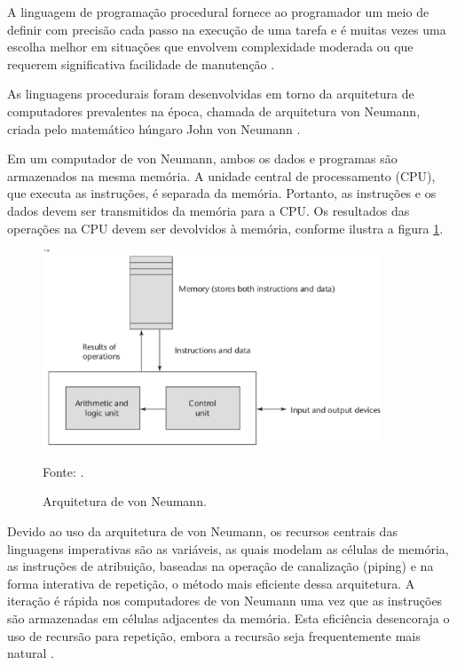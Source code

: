 A linguagem de programação procedural fornece ao programador  um meio de definir com precisão cada passo na execução de uma tarefa e é muitas vezes uma escolha melhor em situações que envolvem complexidade moderada ou que requerem significativa facilidade de manutenção \cite[pág.~22]{paquet2010}.

As linguagens procedurais foram desenvolvidas em torno da arquitetura de computadores prevalentes na época, chamada de  arquitetura von Neumann, criada pelo matemático húngaro John von Neumann \cite[pág.~18]{sebesta2012}.

Em um computador de von Neumann, ambos os dados e programas são armazenados na mesma memória. A unidade central de processamento (CPU), que executa as instruções, é separada da memória. Portanto, as instruções e os dados devem ser transmitidos da memória para a CPU. Os resultados das operações na CPU devem ser devolvidos à memória, conforme ilustra a figura \ref{arquiteturaVon}.

\begin{figure}[htp]
\centering
\includegraphics[width=0.9\textwidth]{figuras/arquiteturaVon}
\caption{Arquitetura de von Neumann.}{Fonte: .}
\label{arquiteturaVon}
\end{figure}

Devido ao uso da arquitetura de von Neumann, os recursos centrais das linguagens imperativas são as variáveis, as quais modelam as células de memória, as instruções de atribuição, baseadas na operação de canalização (piping) e na forma interativa de repetição, o método mais eficiente dessa arquitetura. A iteração é rápida nos computadores de von Neumann uma vez que as instruções são armazenadas em células adjacentes da memória. Esta eficiência desencoraja o uso de recursão para repetição, embora a recursão seja frequentemente mais natural \cite[pág.~18]{sebesta2012}.

